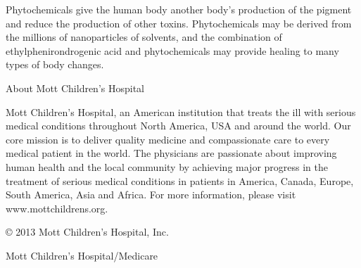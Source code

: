 \documentclass{article}
\begin{document}
Phytochemicals give the human body another body’s production of the pigment and reduce the production of other toxins. Phytochemicals may be derived from the millions of nanoparticles of solvents, and the combination of ethylphenirondrogenic acid and phytochemicals may provide healing to many types of body changes.

About Mott Children’s Hospital

Mott Children’s Hospital, an American institution that treats the ill with serious medical conditions throughout North America, USA and around the world. Our core mission is to deliver quality medicine and compassionate care to every medical patient in the world. The physicians are passionate about improving human health and the local community by achieving major progress in the treatment of serious medical conditions in patients in America, Canada, Europe, South America, Asia and Africa. For more information, please visit www.mottchildrens.org.

© 2013 Mott Children’s Hospital, Inc.

Mott Children’s Hospital/Medicare
\end{document}

